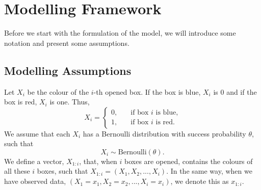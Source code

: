 \section{Modelling Framework}
Before we start with the formulation of the model, we will introduce some notation and present some assumptions. 

\subsection{Modelling Assumptions}
\label{section_notation}
Let $X_i$ be the colour of the $i$-th opened box. If the box is blue, $X_i$ is 0 and if the box is red, $X_i$ is one. Thus,
\begin{equation*}
    X_i = \begin{cases}
    0,& \quad \text{if box } i \text{ is blue,}\\
    1,& \quad \text{if box } i \text{ is red.}
    \end{cases}
\end{equation*}
We assume that each $X_i$ has a Bernoulli distribution with success probability $\theta$, such that
\begin{equation*}
    X_i \sim \text{Bernoulli}(\theta).
\end{equation*}
We define a vector, $X_{1:i}$, that, when $i$ boxes are opened,
contains the colours of all these $i$ boxes, such that $X_{1:i} = (X_1,X_2,...,X_{i})$. In the same way, when we have observed data, $(X_1=x_1,X_2=x_2,...,X_i=x_i)$, we denote this as $x_{1:i}$.

